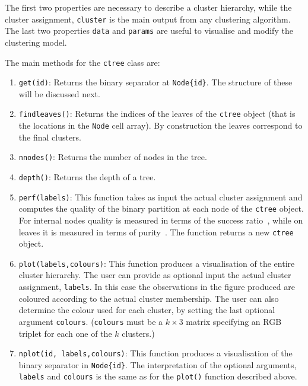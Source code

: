 \documentclass{book}
\begin{document}
The first two properties are necessary to describe a cluster hierarchy, while
the cluster assignment, {\tt cluster} is the main output from any clustering
algorithm. The last two properties {\tt data} and {\tt params} are useful to
visualise and modify the clustering model.

The main methods for the {\tt ctree} class are:

\begin{enumerate}

\item {\tt get(id)}: Returns the binary separator at {\tt Node\{id\}}. The structure of these
will be discussed next.

\item {\tt findleaves()}: Returns the indices of the leaves of the {\tt ctree} object (that is the locations in the {\tt Node} cell array). By
construction the leaves correspond to the final clusters.

\item {\tt nnodes()}: Returns the number of nodes in the tree.

\item {\tt depth()}: Returns the depth of a tree.



\item {\tt perf(labels)}: This function takes as input the actual cluster assignment and computes
the quality of the binary partition at each node of the {\tt ctree} object. For internal nodes quality
is measured in terms of the success ratio~\cite{PavlidisHT2016}, while on leaves it is 
measured in terms of purity~\cite{ZhaoK2004}. The function returns a new {\tt ctree} object.

\item {\tt plot(labels,colours)}: This function produces a visualisation of the entire cluster hierarchy. The
user can provide as optional input the actual cluster assignment, {\tt labels}. In this case the observations
in the figure produced are coloured according to the actual cluster membership. The user can also determine the
colour used for each cluster, by setting the last optional argument {\tt colours}. ({\tt colours} must
be a $k \times$3 matrix specifying an RGB triplet for each one of the $k$ clusters.)

\item {\tt nplot(id, labels,colours)}: This function produces a visualisation of the
binary separator in {\tt Node\{id\}}. The interpretation of the optional arguments, {\tt labels} and
{\tt colours} is the same as for the {\tt plot()} function described above.


\end{enumerate}
\end{document}
